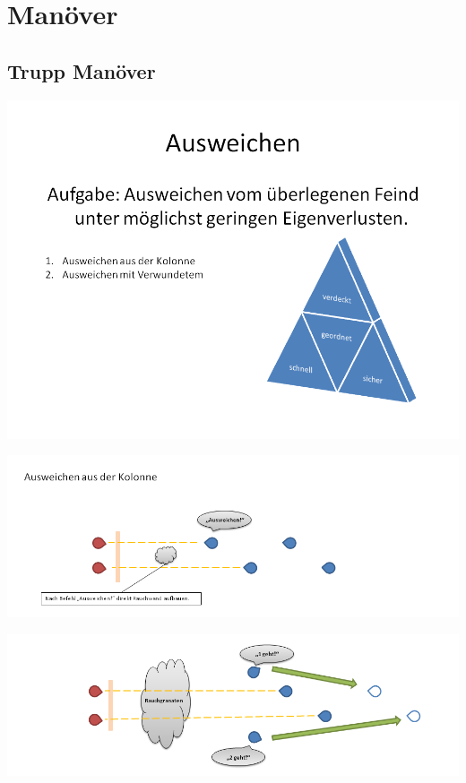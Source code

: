 \newpage
\section{Manöver}
\subsection{Trupp Manöver}

\begin{minipage}[t]{1\textwidth}
	\includegraphics[width=\textwidth]{./Grafiken/Abschnitt/Ausweichen_teaser.png}
\end{minipage}

\begin{minipage}[t]{1\textwidth}
	\includegraphics[width=\textwidth]{./Grafiken/Abschnitt/Ausweichen_aus_Kolonne.png}
\end{minipage}

\begin{minipage}[t]{1\textwidth}
	\includegraphics[width=\textwidth]{./Grafiken/Abschnitt/Ausweichen_aus_Kolonne_2.png}
\end{minipage}

